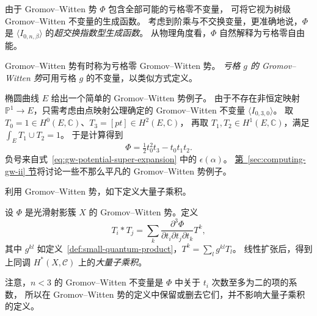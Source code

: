 由于 Gromov--Witten 势 $\Phi$ 包含全部可能的亏格零不变量，
可将它视为树级 Gromov--Witten 不变量的生成函数。
考虑到阶乘与不交换变量，更准确地说，$\Phi$ 是
$\langle I_{0,n,\beta}\rangle$ 的\emph{超交换指数型生成函数}。
从物理角度看，$\Phi$ 自然解释为亏格零自由能。

Gromov--Witten 势有时称为亏格零 Gromov--Witten 势。
\emph{亏格 $g$ 的 Gromov--Witten 势}可用亏格 $g$ 的不变量，以类似方式定义。

椭圆曲线 $E$ 给出一个简单的 Gromov--Witten 势例子。
由于不存在非恒定映射 $\mathbb P^1\to E$，只需考虑由点映射公理确定的
Gromov--Witten 不变量 $\langle I_{0,3,0}\rangle$。
取 $T_0=1\in H^0(E,\mathbb C)$、$T_3=[pt]\in H^2(E,\mathbb C)$，
再取 $T_1,T_2\in H^1(E,\mathbb C)$，满足 $\int_ET_1\cup T_2=1$。
于是计算得到
\begin{equation}\label{eq:elliptic-gw-potential}
\Phi=\tfrac12t_0^2t_3-t_0t_1t_2.
\end{equation}
负号来自式~\eqref{eq:gw-potential-super-expansion} 中的 $\epsilon(\alpha)$。
\hyperref[sec:computing-gw-ii]{第~\ref*{sec:computing-gw-ii} 节}将讨论一些不那么平凡的 Gromov--Witten 势例子。

利用 Gromov--Witten 势，如下定义大量子乘积。
\begin{definition}\label{def:big-quantum-product}
设 $\Phi$ 是光滑射影簇 $X$ 的 Gromov--Witten 势。定义
\[
T_i*T_j=\sum_k\frac{\partial^3\Phi}{\partial t_i\partial t_j\partial t_k}T^k,
\]
其中 $g^{kl}$ 如定义~\ref{def:small-quantum-product}，$T^k=\sum_lg^{kl}T_l$。
线性扩张后，得到上同调 $H^*(X,\mathcal C)$ 上的\emph{大量子乘积}。
\end{definition}
注意，$n<3$ 的 Gromov--Witten 不变量是 $\Phi$ 中关于 $t_i$ 次数至多为二的项的系数，
所以在 Gromov--Witten 势的定义中保留或删去它们，并不影响大量子乘积的定义。

